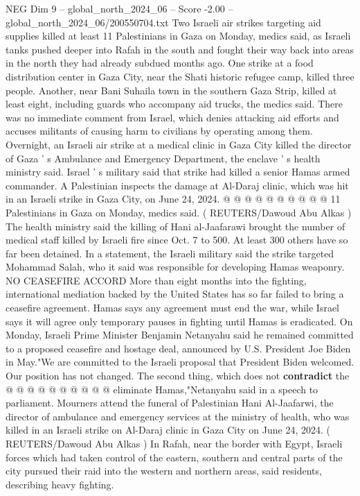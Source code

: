\begin{textsample}{NEG Dim 9 – global\_north\_2024\_06 – Score -2.00 – global\_north\_2024\_06/200550704.txt}  \label{ex:f9_neg_168}
Two Israeli air strikes targeting aid supplies killed at least 11 Palestinians in Gaza on Monday, medics said, as Israeli tanks pushed deeper into Rafah in the south and fought their way back into areas in the north they had already subdued months ago.
One strike at a food distribution center in Gaza City, near the Shati historic refugee camp, killed three people.
Another, near Bani Suhaila town in the southern Gaza Strip, killed at least eight, including guards who accompany aid trucks, the medics said.
There was no immediate comment from Israel, which denies attacking aid efforts and accuses militants of causing harm to civilians by operating among them.
Overnight, an Israeli air strike at a medical clinic in Gaza City killed the director of Gaza ' s Ambulance and Emergency Department, the enclave ' s health ministry said.
Israel ' s military said that strike had killed a senior Hamas armed commander.
A Palestinian inspects the damage at Al-Daraj clinic, which was hit in an Israeli strike in Gaza City, on June 24, 2024. @ @ @ @ @ @ @ @ @ @ 11 Palestinians in Gaza on Monday, medics said. ( REUTERS/Dawoud Abu Alkas ) The health ministry said the killing of Hani al-Jaafarawi brought the number of medical staff killed by Israeli fire since Oct. 7 to 500.
At least 300 others have so far been detained.
In a statement, the Israeli military said the strike targeted Mohammad Salah, who it said was responsible for developing Hamas weaponry.
NO CEASEFIRE ACCORD More than eight months into the fighting, international mediation backed by the United States has so far failed to bring a ceasefire agreement.
Hamas says any agreement must end the war, while Israel says it will agree only temporary pauses in fighting until Hamas is eradicated.
On Monday, Israeli Prime Minister Benjamin Netanyahu said he remained committed to a proposed ceasefire and hostage deal, announced by U.S.
President Joe Biden in May."We are committed to the Israeli proposal that President Biden welcomed.
Our position has not changed.
The second thing, which does not \textbf{contradict} the @ @ @ @ @ @ @ @ @ @ eliminate Hamas,"Netanyahu said in a speech to parliament.
Mourners attend the funeral of Palestinian Hani Al-Jaafarwi, the director of ambulance and emergency services at the ministry of health, who was killed in an Israeli strike on Al-Daraj clinic in Gaza City on June 24, 2024. ( REUTERS/Dawoud Abu Alkas ) In Rafah, near the border with Egypt, Israeli forces which had taken control of the eastern, southern and central parts of the city pursued their raid into the western and northern areas, said residents, describing heavy fighting.

\end{textsample}
